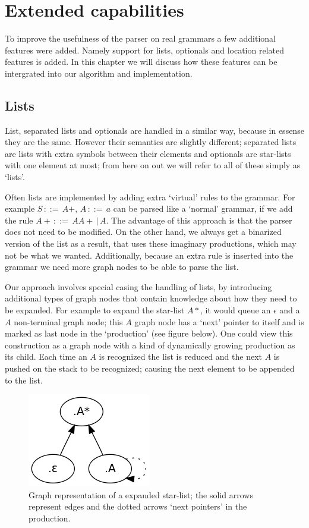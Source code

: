 \documentclass[a4paper,10pt]{article}
\begin{document}
\section{Extended capabilities}

To improve the usefulness of the parser on real grammars a few additional features were added. Namely support for lists, optionals and location related features is added. In this chapter we will discuss how these features can be intergrated into our algorithm and implementation.

\subsection{Lists}

List, separated lists and optionals are handled in a similar way, because in essense they are the same. However their semantics are slightly different; separated lists are lists with extra symbols between their elements and optionals are star-lists with one element at most; from here on out we will refer to all of these simply as `lists'.

Often lists are implemented by adding extra `virtual' rules to the grammar. For example $S\,::=\,A+,\,A\,::=\,a$ can be parsed like a `normal' grammar, if we add the rule $A+\,::=\,AA+\,|\,A$. The advantage of this approach is that the parser does not need to be modified. On the other hand, we always get a binarized version of the list as a result, that uses these imaginary productions, which may not be what we wanted. Additionally, because an extra rule is inserted into the grammar we need more graph nodes to be able to parse the list.

Our approach involves special casing the handling of lists, by introducing additional types of graph nodes that contain knowledge about how they need to be expanded. For example to expand the star-list $A*$, it would queue an $\epsilon$ and a $A$ non-terminal graph node; this $A$ graph node has a `next' pointer to itself and is marked as last node in the `production' (see figure below). One could view this construction as a graph node with a kind of dynamically growing production as its child. Each time an $A$ is recognized the list is reduced and the next $A$ is pushed on the stack to be recognized; causing the next element to be appended to the list.

\begin{figure}[H]
\centering
\includegraphics[scale=0.5]{star-list.png}
\caption{Graph representation of a expanded star-list; the solid arrows represent edges and the dotted arrows `next pointers' in the production.}
\end{figure}
\end{document}
